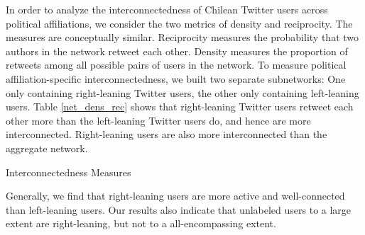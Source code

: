         In order to analyze the interconnectedness of Chilean Twitter users across political affiliations, we consider the two metrics of density and reciprocity. The measures are conceptually similar. Reciprocity measures the probability that two authors in the network retweet each other. Density measures the proportion of retweets among all possible pairs of users in the network. To measure political affiliation-specific interconnectedness, we built two separate subnetworks: One only containing right-leaning Twitter users, the other only containing left-leaning users. Table \ref{net_dens_rec} shows that right-leaning Twitter users retweet each other more than the left-leaning Twitter users do, and hence are more interconnected. Right-leaning users are also more interconnected than the aggregate network. 
        
        
        \begin{table}[!htb]
                \centering
                
                
                
                \caption{Interconnectedness Measures}
                
                
                \label{net_dens_rec}
            \end{table}
        
        
            \newline\indent
        Generally, we find that right-leaning users are more active and well-connected than left-leaning users. Our results also indicate that unlabeled users to a large extent are right-leaning, but not to a all-encompassing extent.
        
        
        
        
